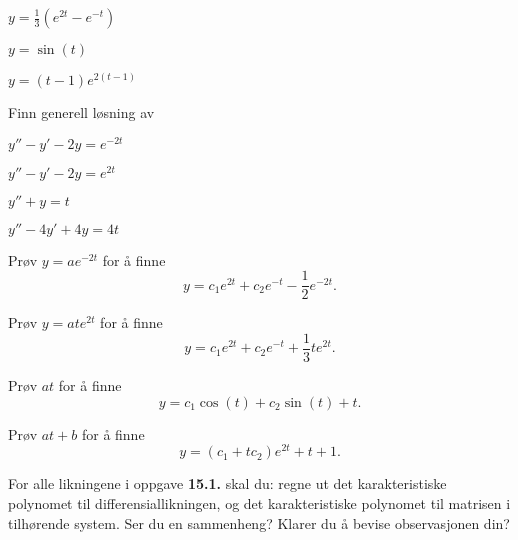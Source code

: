 \begin{losning}
	\begin{punkt}
		$y=\frac{1}{3}( e^{2t}- e^{-t})$
	\end{punkt}
	
	\begin{punkt}
		$y= \sin (t)$
	\end{punkt}
	
	\begin{punkt}
		$y=(t-1)e^{2(t-1)}$
	\end{punkt}
	
\end{losning}


\begin{oppgave}
	Finn generell løsning av
	\begin{punkt}
		$y''-y'-2y=e^{-2t}$
	\end{punkt}

	\begin{punkt}
		$y''-y'-2y=e^{2t}$
	\end{punkt}
	
	\begin{punkt}
		$y''+y=t$
	\end{punkt}
	
	\begin{punkt}
		$y''-4y'+4y=4t$
	\end{punkt}
	
\end{oppgave}

\begin{losning}
	\begin{punkt} Prøv $y=a e^{-2t}$ for å finne
		$$y=c_1 e^{2t}+c_2 e^{-t}-\frac{1}{2}e^{-2t}.$$
	\end{punkt}

	\begin{punkt} Prøv $y=a t e^{2t}$ for å finne
		$$y=c_1 e^{2t}+c_2 e^{-t}+\frac{1}{3} t e^{2t}.$$
	\end{punkt}
	
	\begin{punkt} Prøv $a t$ for å finne
		$$y=c_1\cos(t)+ c_2 \sin (t)+t.$$
	\end{punkt}
	
	\begin{punkt} Prøv $at+b$ for å finne
		$$y=(c_1+tc_2)e^{2t}+t+1.$$
	\end{punkt}
	
\end{losning}

\begin{oppgave}
For alle likningene i oppgave \textbf{15.1.} skal du: regne ut det karakteristiske polynomet til differensiallikningen, og det karakteristiske polynomet til matrisen i tilhørende system. Ser du en sammenheng? Klarer du å bevise observasjonen din?
\end{oppgave}

